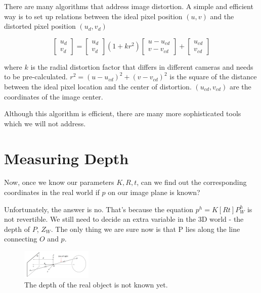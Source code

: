 \documentclass[]{article}
\begin{document}
There are many algorithms that address image distortion. A simple and efficient way is to set up relations between the ideal pixel position $(u,v)$ and the distorted pixel position $(u_d,v_d)$

\begin{equation}
\begin{bmatrix}
    u_d \\
    v_d
\end{bmatrix}
=
\begin{bmatrix}
    u_d \\
    v_d
\end{bmatrix}
(1+kr^2)
\begin{bmatrix}
    u-u_{cd} \\
    v-v_{cd}
\end{bmatrix}
+
\begin{bmatrix}
    u_{cd} \\
    v_{cd}
\end{bmatrix}
\end{equation}

where $k$ is the radial distortion factor that differs in different cameras and needs to be pre-calculated. $r^2=(u-u_{cd})^2+(v-v_{cd})^2$ is the square of the distance between the ideal pixel location and the center of distortion. $(u_{cd},v_{cd})$ are the coordinates of the image center.

Although this algorithm is efficient, there are many more sophisticated tools which we will not address.

\section{Measuring Depth}
Now, once we know our parameters $K,R,t$, can we find out the corresponding coordinates in the real world if $p$ on our image plane is known? 

Unfortunately, the answer is no. That's because the equation $p^h=K[R t]P_W^h$ is not revertible. We still need to decide an extra variable in the 3D world - the depth of $P$, $Z_W$. The only thing we are sure now is that P lies along the line connecting $O$ and $p$. 

\begin{figure}[H]
\includegraphics[width=0.3\textwidth]{measuring_depth.png}
\centering
\caption{The depth of the real object is not known yet.}
\label{fig:measuring_depth}
\end{figure}
\end{document}
